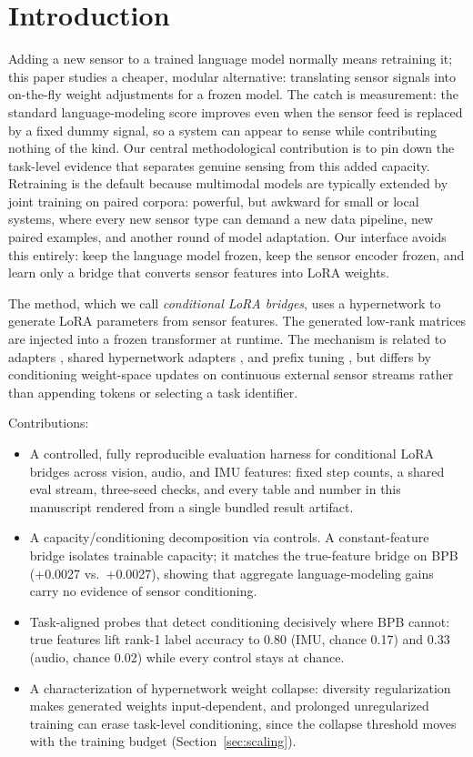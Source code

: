 \documentclass[11pt]{article}
\begin{document}
\section{Introduction}
Adding a new sensor to a trained language model normally means retraining it; this paper studies a cheaper, modular alternative: translating sensor signals into on-the-fly weight adjustments for a frozen model. The catch is measurement: the standard language-modeling score improves even when the sensor feed is replaced by a fixed dummy signal, so a system can appear to sense while contributing nothing of the kind. Our central methodological contribution is to pin down the task-level evidence that separates genuine sensing from this added capacity. Retraining is the default because multimodal models are typically extended by joint training on paired corpora: powerful, but awkward for small or local systems, where every new sensor type can demand a new data pipeline, new paired examples, and another round of model adaptation. Our interface avoids this entirely: keep the language model frozen, keep the sensor encoder frozen, and learn only a bridge that converts sensor features into LoRA weights.

The method, which we call \emph{conditional LoRA bridges}, uses a hypernetwork \cite{ha2016hypernetworks} to generate LoRA parameters \cite{hu2021lora} from sensor features. The generated low-rank matrices are injected into a frozen transformer at runtime. The mechanism is related to adapters \cite{houlsby2019adapters}, shared hypernetwork adapters \cite{mahabadi2021hyperformer}, and prefix tuning \cite{li2021prefixtuning}, but differs by conditioning weight-space updates on continuous external sensor streams rather than appending tokens or selecting a task identifier.

Contributions:
\begin{itemize}[leftmargin=*]
  \item A controlled, fully reproducible evaluation harness for conditional LoRA bridges across vision, audio, and IMU features: fixed step counts, a shared eval stream, three-seed checks, and every table and number in this manuscript rendered from a single bundled result artifact.
  \item A capacity/conditioning decomposition via controls. A constant-feature bridge isolates trainable capacity; it matches the true-feature bridge on BPB (+0.0027 vs.\ +0.0027), showing that aggregate language-modeling gains carry no evidence of sensor conditioning.
  \item Task-aligned probes that detect conditioning decisively where BPB cannot: true features lift rank-1 label accuracy to 0.80 (IMU, chance 0.17) and 0.33 (audio, chance 0.02) while every control stays at chance.
  \item A characterization of hypernetwork weight collapse: diversity regularization makes generated weights input-dependent, and prolonged unregularized training can erase task-level conditioning, since the collapse threshold moves with the training budget (Section~\ref{sec:scaling}).
\end{itemize}
\end{document}
